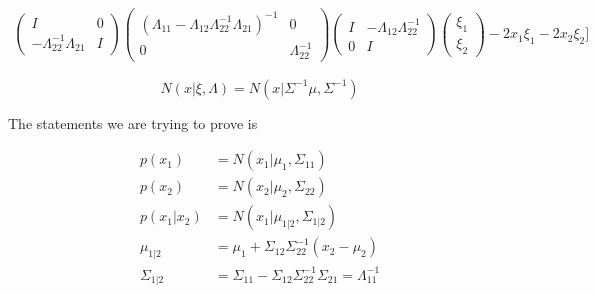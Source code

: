 {\begin{align}
\begin{pmatrix}
        I & 0 \\ 
        -\Lambda_{22}^{-1}\Lambda_{21} & I 
    \end{pmatrix}
    \begin{pmatrix}
        (\Lambda_{11}-\Lambda_{12}\Lambda_{22}^{-1}\Lambda_{21})^{-1} & 0\\ 
        0 & \Lambda_{22}^{-1}
    \end{pmatrix}
    \begin{pmatrix}
        I & -\Lambda_{12}\Lambda_{22}^{-1} \\ 
        0 & I
    \end{pmatrix}
    \begin{pmatrix}
        \xi_1\\ \xi_2 
    \end{pmatrix}
    - 2x_1 \xi_1 -2x_2 \xi_2 ]
\end{align}

$$N(x|\xi, \Lambda) = N(x|\Sigma^{-1} \mu, \Sigma^{-1})$$

The statements we are trying to prove is

\begin{align}
p(x_1) & = N(x_1|\mu_1, \Sigma_{11}) \\
p(x_2) & = N(x_2|\mu_2, \Sigma_{22}) \\
p(x_1|x_2) & = N(x_1|\mu_{1|2}, \Sigma_{1|2}) \\
\mu_{1|2} & = \mu_1 + \Sigma_{12}\Sigma_{22}^{-1}(x_2 - \mu_2) \\
\Sigma_{1|2} &=\Sigma_{11}-\Sigma_{12}\Sigma_{22}^{-1}\Sigma_{21}=\Lambda_{11}^{-1}
\end{align}

}

